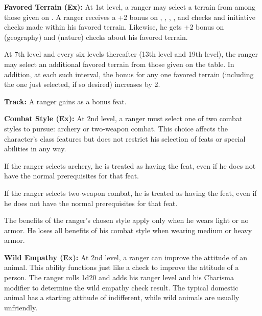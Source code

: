 

\textbf{Favored Terrain (Ex):} At 1st level, a ranger may select a terrain from among those given on . A ranger receives a +2 bonus on , , , ,  and  checks and initiative checks made within his favored terrain. Likewise, he gets +2 bonus on  (geography) and  (nature) checks about his favored terrain.

At 7th level and every six levels thereafter (13th level and 19th level), the ranger may select an additional favored terrain from those given on the table. In addition, at each such interval, the bonus for any one favored terrain (including the one just selected, if so desired) increases by 2.


\textbf{Track:} A ranger gains  as a bonus feat.


\textbf{Combat Style (Ex):} At 2nd level, a ranger must select one of two combat styles to pursue: archery or two-weapon combat. This choice affects the character's class features but does not restrict his selection of feats or special abilities in any way.

If the ranger selects archery, he is treated as having the  feat, even if he does not have the normal prerequisites for that feat.

If the ranger selects two-weapon combat, he is treated as having the  feat, even if he does not have the normal prerequisites for that feat.

The benefits of the ranger's chosen style apply only when he wears light or no armor. He loses all benefits of his combat style when wearing medium or heavy armor.


\textbf{Wild Empathy (Ex):} At 2nd level, a ranger can improve the attitude of an animal. This ability functions just like a  check to improve the attitude of a person. The ranger rolls 1d20 and adds his ranger level and his Charisma modifier to determine the wild empathy check result. The typical domestic animal has a starting attitude of indifferent, while wild animals are usually unfriendly.

